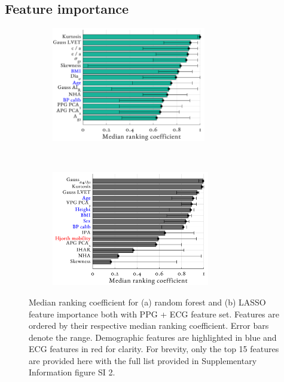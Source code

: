 \documentclass[fleqn,10pt]{wlscirep}
\begin{document}
\subsection{Feature importance}


\begin{figure}[ht]
	\centering
	\begin{subfigure}{.4\textwidth}
		\centering
		\includegraphics[height = 5cm]{feature_results_15_RF.png}
		\caption{}
	\end{subfigure}
	~
	\begin{subfigure}{.4\textwidth}
		\centering
		\includegraphics[height = 5cm]{feature_results_15_LR.png}
		\caption{}
	\end{subfigure}
	\caption{Median ranking coefficient for (a) random forest and (b) LASSO feature importance both with PPG + ECG feature set. Features are ordered by their respective median ranking coefficient. Error bars denote the range. Demographic features are highlighted in blue and ECG features in red for clarity. For brevity, only the top 15 features are provided here with the full list provided in Supplementary Information figure SI 2.}
	\label{fig:Ranking_coeffs}
\end{figure}
\end{document}
